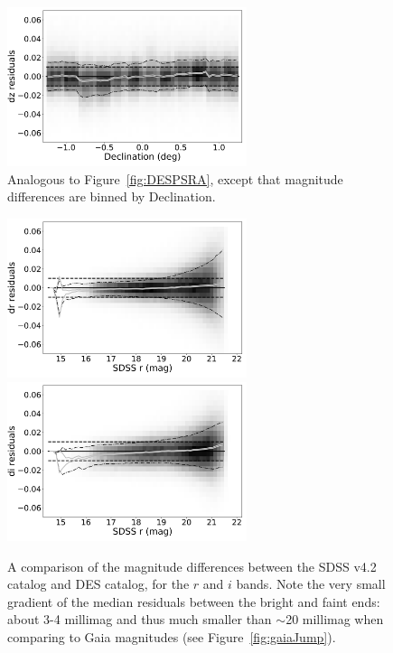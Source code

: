 \documentclass[fleqn,usenatbib]{mnras}
\begin{document}
\begin{figure}
    \centering\includegraphics[width=7cm]{figures/colorResidPSDR2v42bright_dz_Dec_Hess.png}
\caption{Analogous to Figure~\ref{fig:DESPSRA}, except that magnitude differences
are binned by Declination.}
\label{fig:DESPSDec}
\end{figure}

\begin{figure}
    \centering\includegraphics[width=7cm]{figures/colorResidDES42_dr_rmag_Hess.png}
    \centering\includegraphics[width=7cm]{figures/colorResidDES42_di_rmag_Hess.png} 
\caption{A comparison of the magnitude differences between the SDSS v4.2 catalog
and DES catalog, for the $r$ and $i$ bands. Note the very small gradient of the median
residuals between the bright and faint ends: about 3-4 millimag and thus much smaller
than $\sim$20 millimag when comparing to Gaia magnitudes (see Figure~\ref{fig:gaiaJump}).} 
\label{fig:drVSr}
\end{figure}

\end{document}
